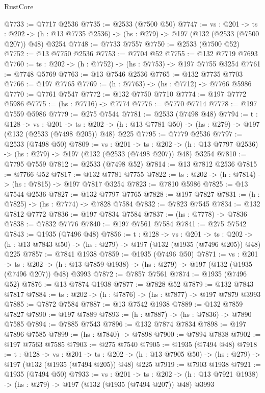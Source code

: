 \begin{lexlean}{RustCore}
\begin{coremodule}
@7733 := @7717 @2536
@7735 := @2533 (@7500 @50)
@7747 := {vs : @201} ->
  {ts : @202} -> (h : @13 @7735 @2536) -> (hs : @279) -> @197 (@132 (@2533 (@7500 @207)) @48) @3254
@7748 := @7733 @7557
@7750 := @2533 (@7500 @52)
@7752 := @13 @7750 @2536
@7753 := @7704 @52
@7755 := @132 @7719 @7693
@7760 := {ts : @202} -> (h : @7752) -> (hs : @7753) -> @197 @7755 @3254
@7761 := @7748 @5769
@7763 := @13 @7546 @2536
@7765 := @132 @7735 @7703
@7766 := @197 @7765
@7769 := (h : @7763) -> (hs : @7712) -> @7766 @5986
@7770 := @7761 @7547
@7772 := @132 @7750 @7710
@7774 := @197 @7772 @5986
@7775 := (hs : @7716) -> @7774
@7776 := @7770 @7714
@7778 := @197 @7559 @5986
@7779 := @275 @7544
@7781 := @2533 (@7498 @48)
@7794 := {t : @128} ->
  {vs : @201} ->
  {ts : @202} -> (h : @13 @7781 @50) -> (hs : @279) -> @197 (@132 (@2533 (@7498 @205)) @48) @225
@7795 := @7779 @2536
@7797 := @2533 (@7498 @50)
@7809 := {vs : @201} ->
  {ts : @202} -> (h : @13 @7797 @2536) -> (hs : @279) -> @197 (@132 (@2533 (@7498 @207)) @48) @3254
@7810 := @7795 @7559
@7812 := @2533 (@7498 @52)
@7814 := @13 @7812 @2536
@7815 := @7766 @52
@7817 := @132 @7781 @7755
@7822 := {ts : @202} -> (h : @7814) -> (hs : @7815) -> @197 @7817 @3254
@7823 := @7810 @5986
@7825 := @13 @7544 @2536
@7827 := @132 @7797 @7765
@7828 := @197 @7827
@7831 := (h : @7825) -> (hs : @7774) -> @7828 @7584
@7832 := @7823 @7545
@7834 := @132 @7812 @7772
@7836 := @197 @7834 @7584
@7837 := (hs : @7778) -> @7836
@7838 := @7832 @7776
@7840 := @197 @7561 @7584
@7841 := @275 @7542
@7843 := @1935 (@7496 @48)
@7856 := {t : @128} ->
  {vs : @201} ->
  {ts : @202} -> (h : @13 @7843 @50) -> (hs : @279) -> @197 (@132 (@1935 (@7496 @205)) @48) @225
@7857 := @7841 @1938
@7859 := @1935 (@7496 @50)
@7871 := {vs : @201} ->
  {ts : @202} -> (h : @13 @7859 @1938) -> (hs : @279) -> @197 (@132 (@1935 (@7496 @207)) @48) @3993
@7872 := @7857 @7561
@7874 := @1935 (@7496 @52)
@7876 := @13 @7874 @1938
@7877 := @7828 @52
@7879 := @132 @7843 @7817
@7884 := {ts : @202} -> (h : @7876) -> (hs : @7877) -> @197 @7879 @3993
@7885 := @7872 @7584
@7887 := @13 @7542 @1938
@7889 := @132 @7859 @7827
@7890 := @197 @7889
@7893 := (h : @7887) -> (hs : @7836) -> @7890 @7585
@7894 := @7885 @7543
@7896 := @132 @7874 @7834
@7898 := @197 @7896 @7585
@7899 := (hs : @7840) -> @7898
@7900 := @7894 @7838
@7902 := @197 @7563 @7585
@7903 := @275 @7540
@7905 := @1935 (@7494 @48)
@7918 := {t : @128} ->
  {vs : @201} ->
  {ts : @202} -> (h : @13 @7905 @50) -> (hs : @279) -> @197 (@132 (@1935 (@7494 @205)) @48) @225
@7919 := @7903 @1938
@7921 := @1935 (@7494 @50)
@7933 := {vs : @201} ->
  {ts : @202} -> (h : @13 @7921 @1938) -> (hs : @279) -> @197 (@132 (@1935 (@7494 @207)) @48) @3993

\end{coremodule}
\end{lexlean}
